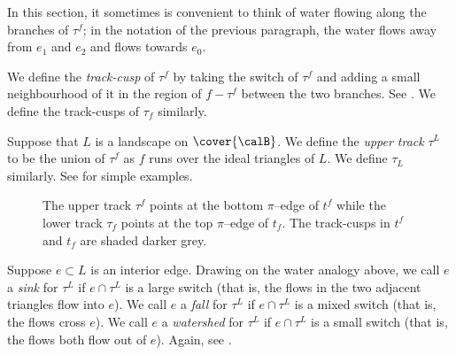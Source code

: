 \documentclass[12pt]{amsart}
\begin{document}
In this section, it sometimes is convenient to think of water flowing along the branches of $\tau^f$; in the notation of the previous paragraph, the water flows away from $e_1$ and $e_2$ and flows towards $e_0$.  

\begin{definition}
\label{Def:TrackCusp}
We define the \emph{track-cusp} of $\tau^f$ by taking the switch of $\tau^f$ and adding a small neighbourhood of it in the region of $f - \tau^f$ between the two branches.  See .  We define the track-cusps of $\tau_f$ similarly. 
\end{definition}

\begin{definition}
\label{Def:UpperTrack}
Suppose that $L$ is a landscape on $\cover{\calB}$.  We define the \emph{upper track} $\tau^L$ to be the union of $\tau^f$ as $f$ runs over the ideal triangles of $L$.  We define $\tau_L$ similarly.  See  for simple examples.  
\end{definition}

\begin{figure}[htbp]
\quad
{}
\quad
{}
\caption{  The upper track $\tau^f$ points at the bottom $\pi$--edge of $t^f$ while the lower track $\tau_f$ points at the top $\pi$--edge of $t_f$. The track-cusps in $t^f$ and $t_f$ are shaded darker grey.}
\label{Fig:UpperLowerTracks}
\end{figure}

Suppose $e \subset L$ is an interior edge.  Drawing on the water analogy above, we call $e$ a \emph{sink} for $\tau^L$ if $e \cap \tau^L$ is a large switch (that is, the flows in the two adjacent triangles flow into $e$).  We call $e$ a \emph{fall} for $\tau^L$ if $e \cap \tau^L$ is a mixed switch (that is, the flows cross $e$).  We call $e$ a \emph{watershed} for $\tau^L$ if $e \cap \tau^L$ is a small switch (that is, the flows both flow out of $e$).  Again, see .
\end{document}
